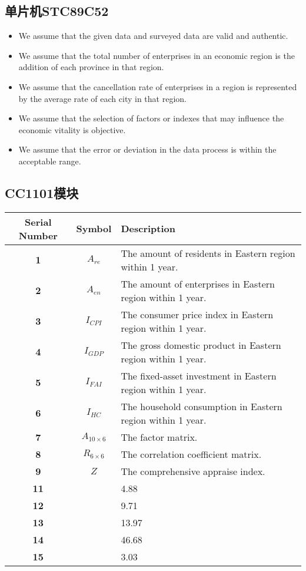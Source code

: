 \documentclass{apmcmthesis}
\begin{document}
\subsection{单片机STC89C52}
\begin{itemize}
  \item We assume that the given data and surveyed data are valid and authentic.
  \item We assume that the total number of enterprises in an economic region is the addition of each province in that region.
  \item We assume that the cancellation rate of enterprises in a region is represented by the average rate of each city in that region.
  \item We assume that the selection of factors or indexes that may influence the economic vitality is objective.
  \item We assume that the error or deviation in the data process is within the acceptable range.
\end{itemize}
\subsection{ CC1101模块}
\begin{longtable}{ccp{200pt}}
\toprule
    \textbf{Serial Number} & \textbf{Symbol} & \textbf{Description} \\
\midrule
    \textbf{1}  & \textbf{${A}_{re}$} & The amount of residents in Eastern region within 1 year.\\
    \textbf{2}  & \textbf{${A}_{en}$} & The amount of enterprises in Eastern region within 1 year.\\
    \textbf{3}  & \textbf{${I}_{CPI}$} & The consumer price index in Eastern region within 1 year.\\
    \textbf{4}  & \textbf{${I}_{GDP}$} & The gross domestic product  in Eastern region within 1 year.\\
    \textbf{5}  & \textbf{${I}_{FAI}$} & The fixed-asset investment in Eastern region within 1 year. \\
    \textbf{6}  & \textbf{${I}_{HC}$} & The household consumption in Eastern region within 1 year. \\
    \textbf{7}  & \textbf{${{A}_{10\times 6}}$} & The factor matrix. \\
    \textbf{8}  & \textbf{$R_{6\times6}$} & The correlation coefficient matrix. \\
    \textbf{9}  & \textbf{$Z$} & The comprehensive appraise index. \\
    \textbf{11}  & \textbf{} & 4.88 \\
    \textbf{12} & \textbf{} & 9.71 \\
    \textbf{13} & \textbf{} & 13.97 \\
    \textbf{14} & \textbf{} & 46.68 \\
    \textbf{15} & \textbf{} & 3.03 \\
\bottomrule
\end{longtable}
\end{document}
